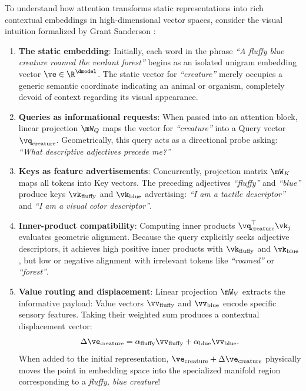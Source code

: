 \documentclass[../../main.tex]{subfiles}
\begin{document}
\begin{intuition}
To understand how attention transforms static representations into rich contextual embeddings in high-dimensional vector spaces, consider the visual intuition formalized by Grant Sanderson \cite{sanderson2024attention}:
\begin{enumerate}
    \item \textbf{The static embedding}: Initially, each word in the phrase \emph{``A fluffy blue creature roamed the verdant forest''} begins as an isolated unigram embedding vector $\ve \in \R^{\dmodel}$. The static vector for \emph{``creature''} merely occupies a generic semantic coordinate indicating an animal or organism, completely devoid of context regarding its visual appearance.
    \item \textbf{Queries as informational requests}: When passed into an attention block, linear projection $\mW_Q$ maps the vector for \emph{``creature''} into a Query vector $\vq_{\text{creature}}$. Geometrically, this query acts as a directional probe asking: \emph{``What descriptive adjectives precede me?''}
    \item \textbf{Keys as feature advertisements}: Concurrently, projection matrix $\mW_K$ maps all tokens into Key vectors. The preceding adjectives \emph{``fluffy''} and \emph{``blue''} produce keys $\vk_{\text{fluffy}}$ and $\vk_{\text{blue}}$ advertising: \emph{``I am a tactile descriptor''} and \emph{``I am a visual color descriptor''}.
    \item \textbf{Inner-product compatibility}: Computing inner products $\vq_{\text{creature}}^\top \vk_j$ evaluates geometric alignment. Because the query explicitly seeks adjective descriptors, it achieves high positive inner products with $\vk_{\text{fluffy}}$ and $\vk_{\text{blue}}$, but low or negative alignment with irrelevant tokens like \emph{``roamed''} or \emph{``forest''}.
    \item \textbf{Value routing and displacement}: Linear projection $\mW_V$ extracts the informative payload: Value vectors $\vv_{\text{fluffy}}$ and $\vv_{\text{blue}}$ encode specific sensory features. Taking their weighted sum produces a contextual displacement vector:
    \begin{equation}
    \Delta \ve_{\text{creature}} = \alpha_{\text{fluffy}} \vv_{\text{fluffy}} + \alpha_{\text{blue}} \vv_{\text{blue}}.
    \end{equation}
    When added to the initial representation, $\ve_{\text{creature}} + \Delta \ve_{\text{creature}}$ physically moves the point in embedding space into the specialized manifold region corresponding to a \emph{fluffy, blue creature}!
\end{enumerate}
\end{intuition}
\end{document}
